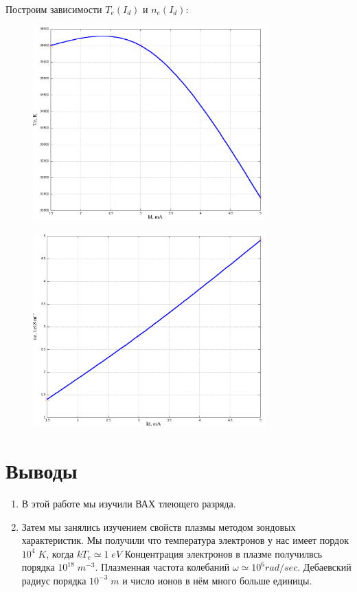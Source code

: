\documentclass{article}
\begin{document}
Построим зависимости \(T_e(I_d)\) и \(n_e(I_d)\):

\begin{figure}[H]
    \centering
    \includegraphics[width=0.8\textwidth]{T-I.png}
\end{figure}

\begin{figure}[H]
    \centering
    \includegraphics[width=0.8\textwidth]{n-I.png}
\end{figure}
\section{Выводы}
\begin{enumerate}
    \item В этой работе мы изучили ВАХ тлеющего разряда.
    \item Затем мы занялись изучением свойств плазмы методом зондовых характеристик.
    Мы получили что температура электронов у нас имеет пордок \(10^4\; K\), когда \(kT_e \simeq 1\; eV\)
    Концентрация электронов в плазме получилвсь порядка \(10^18\; m^{-3}\).
    Плазменная частота колебаний \(\omega \simeq 10^6 rad/sec\).
    Дебаевский радиус порядка \(10^{-3}\; m\) и число ионов в нём много больше единицы.
\end{enumerate}
\end{document}
